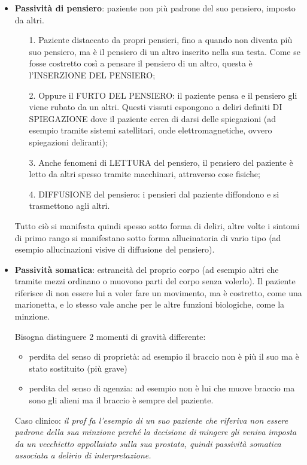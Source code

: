 \begin{itemize}
\item
  \textbf{Passività di pensiero}: paziente non più padrone del suo
  pensiero, imposto da altri.

\begin{itemize}
\item[1.]
  Paziente distaccato da propri pensieri, fino a quando non diventa più
  suo pensiero, ma è il pensiero di un altro inserito nella sua testa.
  Come se fosse costretto così a pensare il pensiero di un altro, questa
  è l'INSERZIONE DEL PENSIERO;
\item[2.]
  Oppure il FURTO DEL PENSIERO: il paziente pensa e il pensiero gli
  viene rubato da un altri. Questi vissuti espongono a deliri definiti
  DI SPIEGAZIONE dove il paziente cerca di darsi delle spiegazioni (ad
  esempio tramite sistemi satellitari, onde elettromagnetiche, ovvero
  spiegazioni deliranti);
\item[3.]
  Anche fenomeni di LETTURA del pensiero, il pensiero del paziente è
  letto da altri spesso tramite macchinari, attraverso cose fisiche;
\item[4.]
  DIFFUSIONE del pensiero: i pensieri dal paziente diffondono e si
  trasmettono agli altri.
\end{itemize}

Tutto ciò si manifesta quindi spesso sotto forma di deliri, altre volte
i sintomi di primo rango si manifestano sotto forma allucinatoria di
vario tipo (ad esempio allucinazioni visive di diffusione del pensiero).

\item
  \textbf{Passività somatica}: estraneità del proprio corpo (ad esempio
  altri che tramite mezzi ordinano o muovono parti del corpo senza
  volerlo). Il paziente riferisce di non essere lui a voler fare un
  movimento, ma è costretto, come una marionetta, e lo stesso vale anche
  per le altre funzioni biologiche, come la minzione.

Bisogna distinguere 2 momenti di gravità differente:

\begin{itemize}
\item
  perdita del senso di proprietà: ad esempio il braccio non è più il suo
  ma è stato sostituito (più grave)
\item
  perdita del senso di agenzia: ad esempio non è lui che muove braccio
  ma sono gli alieni ma il braccio è sempre del paziente.
\end{itemize}

Caso clinico: \emph{il prof fa l'esempio di un suo paziente che riferiva
non essere padrone della sua minzione perché la decisione di mingere gli
veniva imposta da un vecchietto appollaiato sulla sua prostata, quindi
passività somatica associata a delirio di interpretazione.}
\end{itemize}

